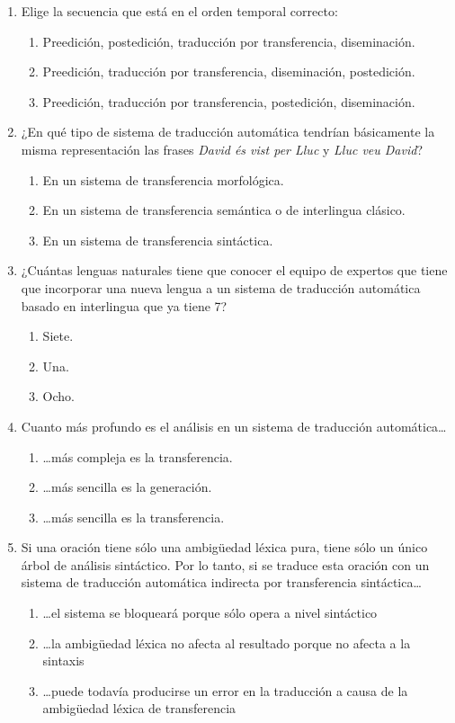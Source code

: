 \begin{enumerate}
\item Elige la secuencia que está en el orden temporal correcto: \begin{enumerate} \item Preedición, postedición, traducción por transferencia, diseminación. \item Preedición, traducción por transferencia, diseminación, postedición. \item Preedición, traducción por transferencia, postedición, diseminación. \end{enumerate} 

\item ¿En qué tipo de sistema de traducción automática tendrían básicamente la misma representación las frases \emph{David és vist per Lluc} y \emph{Lluc veu David}? \begin{enumerate} \item En un sistema de transferencia morfológica. \item En un sistema de transferencia semántica o de interlingua clásico. \item En un sistema de transferencia sintáctica. \end{enumerate} 

\item ¿Cuántas lenguas naturales tiene que conocer el equipo de expertos que tiene que incorporar una nueva lengua a un sistema de traducción automática basado en interlingua que ya tiene 7? \begin{enumerate} \item Siete. \item Una. \item Ocho. \end{enumerate} 

\item Cuanto más profundo es el análisis en un sistema de traducción automática{\ldots} \begin{enumerate} \item {\ldots}más compleja es la transferencia. \item {\ldots}más sencilla es la generación. \item {\ldots}más sencilla es la transferencia. \end{enumerate} 

\item Si una oración tiene sólo una ambigüedad léxica pura, tiene sólo un único árbol de análisis sintáctico. Por lo tanto, si se traduce esta oración con un sistema de traducción automática indirecta por transferencia sintáctica{\ldots} \begin{enumerate} \item {\ldots}el sistema se bloqueará porque sólo opera a nivel sintáctico \item {\ldots}la ambigüedad léxica no afecta al resultado porque no afecta a la sintaxis \item {\ldots}puede todavía producirse un error en la traducción a causa de la ambigüedad léxica de transferencia \end{enumerate} 


\end{enumerate}
